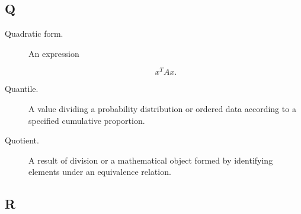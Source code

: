 \subsection*{Q}

\begin{description}

\item[Quadratic form.]
An expression

\[
x^TAx.
\]

\item[Quantile.]
A value dividing a probability distribution or ordered data according to a
specified cumulative proportion.

\item[Quotient.]
A result of division or a mathematical object formed by identifying elements
under an equivalence relation.

\end{description}

\subsection*{R}

